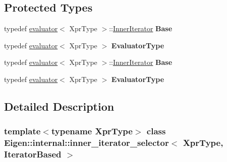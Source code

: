 \subsection*{Protected Types}
\begin{DoxyCompactItemize}
\item 
\mbox{\label{class_eigen_1_1internal_1_1inner__iterator__selector_3_01_xpr_type_00_01_iterator_based_01_4_abc08a7b1b33570a3650f91f499f1c303}} 
typedef \hyperlink{struct_eigen_1_1internal_1_1evaluator}{evaluator}$<$ Xpr\+Type $>$\+::\hyperlink{class_eigen_1_1_inner_iterator}{Inner\+Iterator} {\bfseries Base}
\item 
\mbox{\label{class_eigen_1_1internal_1_1inner__iterator__selector_3_01_xpr_type_00_01_iterator_based_01_4_a28c895cdf4870a02511a8eb5fcede040}} 
typedef \hyperlink{struct_eigen_1_1internal_1_1evaluator}{evaluator}$<$ Xpr\+Type $>$ {\bfseries Evaluator\+Type}
\item 
\mbox{\label{class_eigen_1_1internal_1_1inner__iterator__selector_3_01_xpr_type_00_01_iterator_based_01_4_abc08a7b1b33570a3650f91f499f1c303}} 
typedef \hyperlink{struct_eigen_1_1internal_1_1evaluator}{evaluator}$<$ Xpr\+Type $>$\+::\hyperlink{class_eigen_1_1_inner_iterator}{Inner\+Iterator} {\bfseries Base}
\item 
\mbox{\label{class_eigen_1_1internal_1_1inner__iterator__selector_3_01_xpr_type_00_01_iterator_based_01_4_a28c895cdf4870a02511a8eb5fcede040}} 
typedef \hyperlink{struct_eigen_1_1internal_1_1evaluator}{evaluator}$<$ Xpr\+Type $>$ {\bfseries Evaluator\+Type}
\end{DoxyCompactItemize}


\subsection{Detailed Description}
\subsubsection*{template$<$typename Xpr\+Type$>$\newline
class Eigen\+::internal\+::inner\+\_\+iterator\+\_\+selector$<$ Xpr\+Type, Iterator\+Based $>$}



